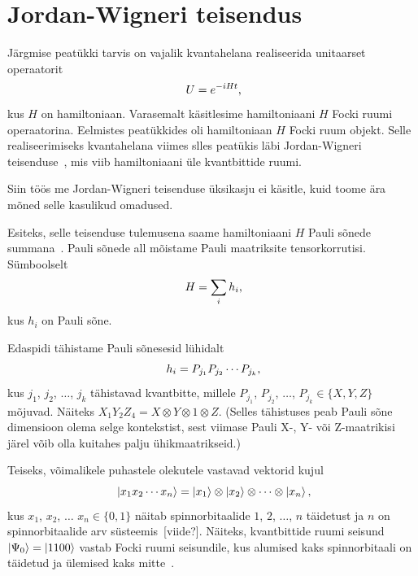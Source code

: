 \documentclass[12pt]{report}
\def\ket#1{\mathinner{|#1\rangle}}
\begin{document}
\section{Jordan-Wigneri teisendus}

Järgmise peatükki tarvis on vajalik kvantahelana realiseerida unitaarset operaatorit
\begin{equation}\label{eq:hamtime}
  U = e^{-iHt}\rlap{,}
\end{equation}
kus \(H\) on hamiltoniaan.
Varasemalt käsitlesime hamiltoniaani \(H\) Focki ruumi operaatorina.
Eelmistes peatükkides oli hamiltoniaan \(H\) Focki ruum objekt.
Selle realiseerimiseks kvantahelana viimes slles peatükis läbi Jordan-Wigneri teisenduse~\cite{jordan+wigner}, mis viib hamiltoniaani üle kvantbittide ruumi.

Siin töös me Jordan-Wigneri teisenduse üksikasju ei käsitle, kuid toome ära mõned selle kasulikud omadused.

Esiteks, selle teisenduse tulemusena saame hamiltoniaani \(H\) Pauli sõnede summana~\cite{whitfield+etal}.
Pauli sõnede all mõistame Pauli maatriksite tensorkorrutisi.
Sümboolselt
\begin{equation}\label{eq:paulisum} H = \sum_i h_i\rlap{,} \end{equation}
kus $h_i$ on Pauli sõne.

Edaspidi tähistame Pauli sõnesesid lühidalt
\begin{equation} h_i=P_{j_1}P_{j_2}\cdots P_{j_k} \rlap{,}\end{equation}
kus \(j_1\), \(j_2\), $\ldots$, \(j_k\) tähistavad kvantbitte, millele \(P_{j_1}\), \(P_{j_2}\), \(\ldots\), \(P_{j_k}\in\{X,Y,Z\}\) mõjuvad.
Näiteks \(X_1Y_2Z_4=X\otimes Y\otimes 1\otimes Z.\)
(Selles tähistuses peab Pauli sõne dimensioon olema selge kontekstist, sest viimase Pauli X-, Y- või Z-maatrikisi järel võib olla kuitahes palju ühikmaatrikseid.)

Teiseks, võimalikele puhastele olekutele vastavad vektorid kujul
\begin{equation}
  \ket{x_1x_2\cdots x_n}
     = \ket{x_1}\otimes\ket{x_2}\otimes\cdots\otimes\ket{x_n}\rlap{,}
\end{equation}
kus $x_1$, $x_2$, $\ldots$ $x_n\in\{0,1\}$ näitab spinnorbitaalide $1$, $2$, $\ldots$, $n$ täidetust ja $n$ on spinnorbitaalide arv süsteemis~[viide?].
Näiteks, kvantbittide ruumi seisund \(\ket{\Psi_0}=\ket{1100}\) vastab Focki ruumi seisundile, kus alumised kaks spinnorbitaali on täidetud ja ülemised kaks mitte~\cite{szabo+ostlund, mcardle+etal}.
\end{document}
